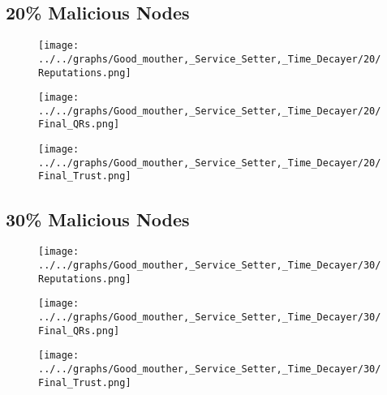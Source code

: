 \begin{minipage}[t]{0.49\columnwidth}
\subsection*{20\% Malicious Nodes}
    \begin{figure}[H]
        \centering
        \texttt{[image: ../../graphs/Good\_mouther,\_Service\_Setter,\_Time\_Decayer/20/Reputations.png]}
    \end{figure}
    \begin{figure}[H]
        \centering
        \texttt{[image: ../../graphs/Good\_mouther,\_Service\_Setter,\_Time\_Decayer/20/Final\_QRs.png]}
    \end{figure}
\end{minipage}
\begin{minipage}[t]{0.49\columnwidth}
    \begin{figure}[H]
        \centering
        \texttt{[image: ../../graphs/Good\_mouther,\_Service\_Setter,\_Time\_Decayer/20/Final\_Trust.png]}
    \end{figure}
\end{minipage}

\begin{minipage}[t]{0.49\columnwidth}
\subsection*{30\% Malicious Nodes}
    \begin{figure}[H]
        \centering
        \texttt{[image: ../../graphs/Good\_mouther,\_Service\_Setter,\_Time\_Decayer/30/Reputations.png]}
    \end{figure}
    \begin{figure}[H]
        \centering
        \texttt{[image: ../../graphs/Good\_mouther,\_Service\_Setter,\_Time\_Decayer/30/Final\_QRs.png]}
    \end{figure}
\end{minipage}
\begin{minipage}[t]{0.49\columnwidth}
    \begin{figure}[H]
        \centering
        \texttt{[image: ../../graphs/Good\_mouther,\_Service\_Setter,\_Time\_Decayer/30/Final\_Trust.png]}
    \end{figure}
\end{minipage}

